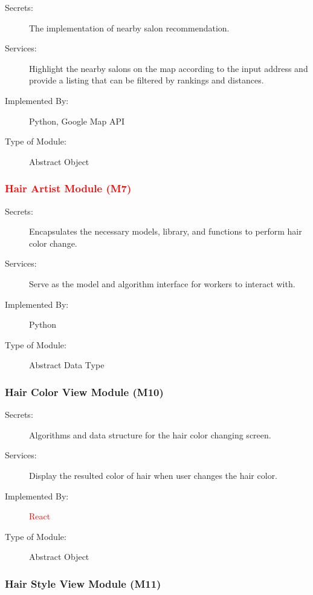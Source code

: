 \documentclass[12pt, titlepage]{article}
\begin{document}
\begin{description}
\item[Secrets:] The implementation of nearby salon recommendation.
\item[Services:] Highlight the nearby salons on the map according to the input address and provide a listing that can be filtered by rankings and distances.

\item[Implemented By:] Python, Google Map API
\item[Type of Module:] Abstract Object
\end{description}

\color{red}
\subsubsection{\textcolor{red}{Hair Artist Module (M7)}}

\begin{description}
\item[Secrets:] Encapsulates the necessary models, library, and functions to perform hair color change. 
\item[Services:] Serve as the model and algorithm interface for workers to interact with.
\item[Implemented By:] Python
\item[Type of Module:] Abstract Data Type
\end{description}

\color{black}

\subsubsection{Hair Color View Module (M10)}

\begin{description}
\item[Secrets:] Algorithms and data structure for the hair color changing screen.
\item[Services:] Display the resulted color of hair when user changes the hair color.
\item[Implemented By:] \textcolor{red}{React}
\item[Type of Module:] Abstract Object
\end{description}

\subsubsection{Hair Style View Module (M11)}
\end{document}
